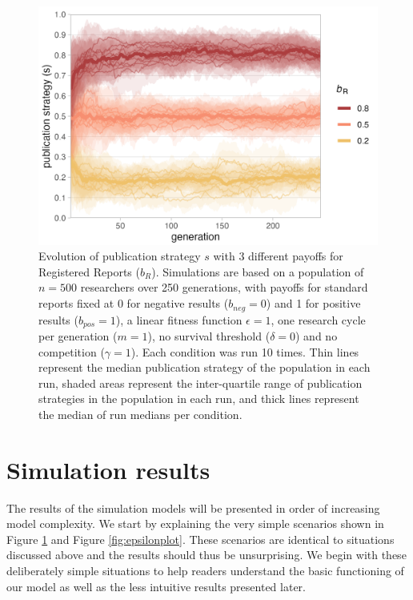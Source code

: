 \documentclass[
  ,man,mask,floatsintext]{apa6}
\begin{document}
\begin{figure}

{\centering \includegraphics[width=5.04in]{plots/plot_evo} 

}

\caption{Evolution of publication strategy \(s\) with 3 different payoffs for Registered Reports (\(b_{R}\)). Simulations are based on a population of \(n = 500\) researchers over 250 generations, with payoffs for standard reports fixed at 0 for negative results (\(b_{neg} = 0\)) and 1 for positive results (\(b_{pos} = 1\)), a linear fitness function \(\epsilon = 1\), one research cycle per generation (\(m = 1\)), no survival threshold (\(\delta = 0\)) and no competition (\(\gamma = 1\)). Each condition was run 10 times. Thin lines represent the median publication strategy of the population in each run, shaded areas represent the inter-quartile range of publication strategies in the population in each run, and thick lines represent the median of run medians per condition.}\label{fig:evoplot}
\end{figure}

\hypertarget{simulation-results}{%
\section{Simulation results}\label{simulation-results}}

The results of the simulation models will be presented in order of increasing model complexity.
We start by explaining the very simple scenarios shown in Figure \ref{fig:evoplot} and Figure \ref{fig:epsilonplot}.
These scenarios are identical to situations discussed above and the results should thus be unsurprising.
We begin with these deliberately simple situations to help
readers understand the basic functioning of our model as well as the less intuitive results presented later.
\end{document}
